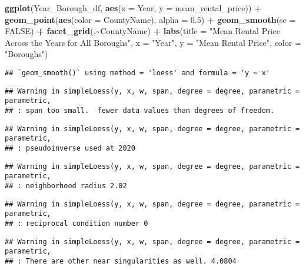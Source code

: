 \documentclass[
]{article}
\newenvironment{Shaded}{\begin{snugshade}}{\end{snugshade}}
\newcommand{\AttributeTok}[1]{\textcolor[rgb]{0.13,0.29,0.53}{#1}}
\newcommand{\ConstantTok}[1]{\textcolor[rgb]{0.56,0.35,0.01}{#1}}
\newcommand{\FloatTok}[1]{\textcolor[rgb]{0.00,0.00,0.81}{#1}}
\newcommand{\FunctionTok}[1]{\textcolor[rgb]{0.13,0.29,0.53}{\textbf{#1}}}
\newcommand{\NormalTok}[1]{#1}
\newcommand{\SpecialCharTok}[1]{\textcolor[rgb]{0.81,0.36,0.00}{\textbf{#1}}}
\newcommand{\StringTok}[1]{\textcolor[rgb]{0.31,0.60,0.02}{#1}}
\begin{document}
\begin{Shaded}
\begin{Highlighting}[]
\FunctionTok{ggplot}\NormalTok{(Year\_Borough\_df, }\FunctionTok{aes}\NormalTok{(}\AttributeTok{x =}\NormalTok{ Year, }\AttributeTok{y =}\NormalTok{ mean\_rental\_price)) }\SpecialCharTok{+} \FunctionTok{geom\_point}\NormalTok{(}\FunctionTok{aes}\NormalTok{(}\AttributeTok{color =}\NormalTok{ CountyName), }\AttributeTok{alpha =} \FloatTok{0.5}\NormalTok{) }\SpecialCharTok{+}
  \FunctionTok{geom\_smooth}\NormalTok{(}\AttributeTok{se =} \ConstantTok{FALSE}\NormalTok{) }\SpecialCharTok{+} \FunctionTok{facet\_grid}\NormalTok{(.}\SpecialCharTok{\textasciitilde{}}\NormalTok{CountyName) }\SpecialCharTok{+} \FunctionTok{labs}\NormalTok{(}\AttributeTok{title =} \StringTok{"Mean Rental Price Across the Years for All Boroughs"}\NormalTok{, }\AttributeTok{x =} \StringTok{"Year"}\NormalTok{, }\AttributeTok{y =} \StringTok{"Mean Rental Price"}\NormalTok{, }\AttributeTok{color =} \StringTok{"Boroughs"}\NormalTok{)}
\end{Highlighting}
\end{Shaded}

\begin{verbatim}
## `geom_smooth()` using method = 'loess' and formula = 'y ~ x'
\end{verbatim}

\begin{verbatim}
## Warning in simpleLoess(y, x, w, span, degree = degree, parametric = parametric,
## : span too small.  fewer data values than degrees of freedom.
\end{verbatim}

\begin{verbatim}
## Warning in simpleLoess(y, x, w, span, degree = degree, parametric = parametric,
## : pseudoinverse used at 2020
\end{verbatim}

\begin{verbatim}
## Warning in simpleLoess(y, x, w, span, degree = degree, parametric = parametric,
## : neighborhood radius 2.02
\end{verbatim}

\begin{verbatim}
## Warning in simpleLoess(y, x, w, span, degree = degree, parametric = parametric,
## : reciprocal condition number 0
\end{verbatim}

\begin{verbatim}
## Warning in simpleLoess(y, x, w, span, degree = degree, parametric = parametric,
## : There are other near singularities as well. 4.0804
\end{verbatim}
\end{document}

